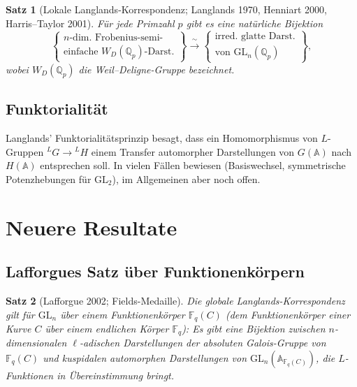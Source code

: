 \documentclass[a4paper,12pt]{amsart}
\newtheorem{theorem}{Satz}[section]
\theoremstyle{definition}
\theoremstyle{remark}
\newcommand{\Q}{\mathbb{Q}}
\newcommand{\GL}{\mathrm{GL}}
\begin{document}
\begin{theorem}[Lokale Langlands-Korrespondenz; Langlands 1970, Henniart 2000, Harris--Taylor 2001]
\label{satz:lokale-langlands}
Für jede Primzahl $p$ gibt es eine natürliche Bijektion
\[
  \left\{
    \begin{array}{c}
      n\text{-dim.\ Frobenius-semi-}\\ \text{einfache } W_{D}(\Q_p)\text{-Darst.}
    \end{array}
  \right\}
  \xrightarrow{\;\sim\;}
  \left\{
    \begin{array}{c}
      \text{irred.\ glatte Darst.}\\ \text{von } \GL_n(\Q_p)
    \end{array}
  \right\},
\]
wobei $W_D(\Q_p)$ die Weil--Deligne-Gruppe bezeichnet.
\end{theorem}

\subsection{Funktorialität}

Langlands' Funktorialitätsprinzip besagt, dass ein Homomorphismus von $L$-Gruppen
${}^L G \to {}^L H$ einem Transfer automorpher Darstellungen von $G(\mathbb{A})$
nach $H(\mathbb{A})$ entsprechen soll. In vielen Fällen bewiesen (Basiswechsel,
symmetrische Potenzhebungen für $\GL_2$), im Allgemeinen aber noch offen.

\section{Neuere Resultate}
\label{sec:neuere-resultate}

\subsection{Lafforgues Satz über Funktionenkörpern}

\begin{theorem}[Lafforgue 2002; Fields-Medaille]
\label{satz:lafforgue}
Die globale Langlands-Korrespondenz gilt für $\GL_n$ über einem Funktionenkörper
$\mathbb{F}_q(C)$ (dem Funktionenkörper einer Kurve $C$ über einem endlichen Körper
$\mathbb{F}_q$): Es gibt eine Bijektion zwischen $n$-dimensionalen $\ell$-adischen
Darstellungen der absoluten Galois-Gruppe von $\mathbb{F}_q(C)$ und kuspidalen
automorphen Darstellungen von $\GL_n(\mathbb{A}_{\mathbb{F}_q(C)})$, die
$L$-Funktionen in Übereinstimmung bringt.
\end{theorem}
\end{document}
